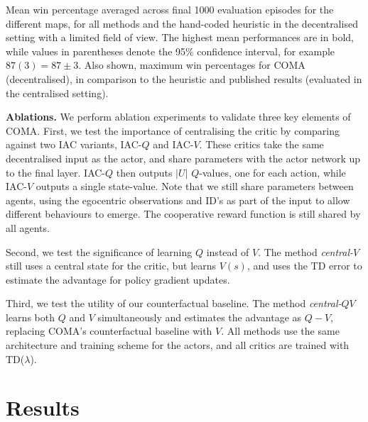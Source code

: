 \documentclass[letterpaper]{article}
\begin{document}
\begin{table}[ht]
\begin{center}
		
		
		
	\end{center}
	\caption{Mean win percentage averaged across final 1000 evaluation episodes 
		for the different maps, for all methods and the hand-coded 
		heuristic in 
		the decentralised setting with a limited field of view. The 
		highest mean performances are in bold, while values in 
		parentheses denote the 95\% confidence interval, for example 
		$87(3) = 87 \pm 3$.
		Also shown, maximum win percentages for COMA (decentralised), in 
		comparison to the heuristic and published results (evaluated in the 
		centralised setting).}
    \vspace{-0.75em}
	\label{tbl:test_in_domain}
	
\end{table}
	

\textbf{Ablations.}
We perform ablation experiments to validate three key elements of COMA. First, 
we test the importance of centralising the critic by comparing 
against two IAC variants, IAC-$Q$ and IAC-$V$. These critics take the same 
decentralised input as the actor, and share parameters with the actor network 
up to the final layer. IAC-$Q$ then outputs $\vert U \vert$ $Q$-values, one for 
each action, while IAC-$V$ outputs a single state-value. Note that we still 
share parameters between agents, using the egocentric observations and ID's as 
part of the input to allow different behaviours to emerge. The cooperative 
reward function is still shared by all agents.

Second, we test the significance of learning $Q$ instead of $V$. The method 
\mbox{\emph{central-$V$}} still uses a central state for the critic, but learns 
$V(s)$, and uses the TD error to estimate the advantage for policy gradient 
updates.

Third, we test the utility of our counterfactual baseline. The method 
\mbox{\emph{central-$QV$}} learns both $Q$ and $V$ simultaneously and estimates 
the 
advantage as $Q-V$, replacing COMA's counterfactual baseline with $V$.
%
All methods use the same architecture and training scheme for the actors, and 
all critics are trained with TD($\lambda$).



\section{Results}
\label{sec:results}
\end{document}
